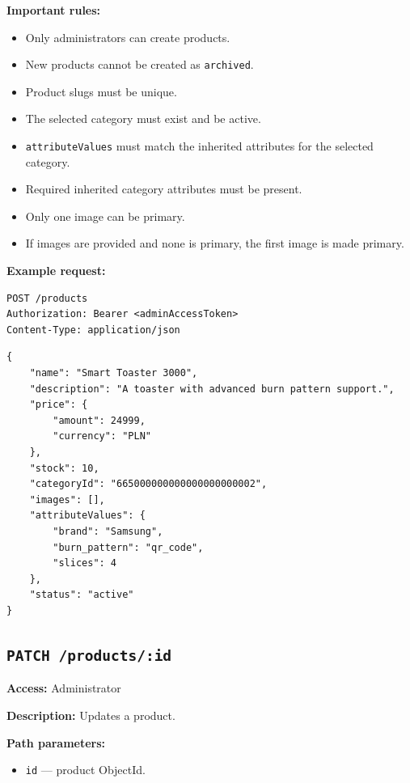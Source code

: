 \textbf{Important rules:}

\begin{itemize}
    \item Only administrators can create products.
    \item New products cannot be created as \texttt{archived}.
    \item Product slugs must be unique.
    \item The selected category must exist and be active.
    \item \texttt{attributeValues} must match the inherited attributes for the selected category.
    \item Required inherited category attributes must be present.
    \item Only one image can be primary.
    \item If images are provided and none is primary, the first image is made primary.
\end{itemize}

\textbf{Example request:}

\begin{verbatim}
POST /products
Authorization: Bearer <adminAccessToken>
Content-Type: application/json
\end{verbatim}

\begin{verbatim}
{
    "name": "Smart Toaster 3000",
    "description": "A toaster with advanced burn pattern support.",
    "price": {
        "amount": 24999,
        "currency": "PLN"
    },
    "stock": 10,
    "categoryId": "665000000000000000000002",
    "images": [],
    "attributeValues": {
        "brand": "Samsung",
        "burn_pattern": "qr_code",
        "slices": 4
    },
    "status": "active"
}
\end{verbatim}

\subsection{\texttt{PATCH /products/:id}}

\textbf{Access:} Administrator

\textbf{Description:} Updates a product.

\textbf{Path parameters:}

\begin{itemize}
    \item \texttt{id} --- product ObjectId.
\end{itemize}


